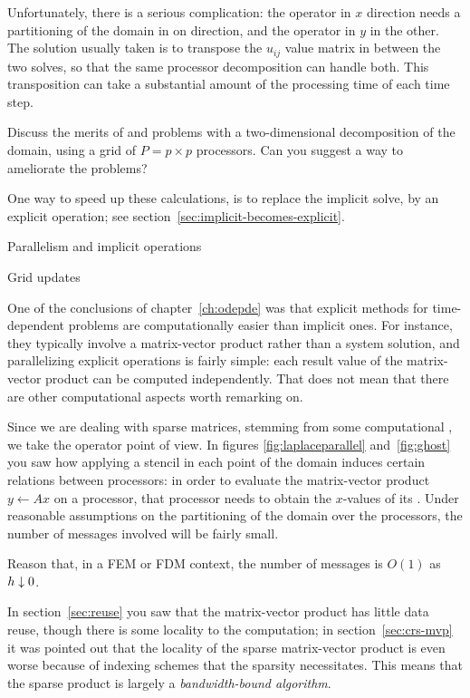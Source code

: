 Unfortunately, there is a serious complication: the operator in $x$
direction needs a partitioning of the domain in on direction, and the
operator in $y$ in the other. The solution usually taken is to
transpose the $u_{ij}$ value matrix in between the two solves, so that
the same processor decomposition can handle both. This transposition
can take a substantial amount of the processing time of each time step.

\begin{exercise}
  Discuss the merits of and problems with a two-dimensional
  decomposition of the domain, using a grid of $P=p\times p$
  processors. Can you suggest a way to ameliorate the problems?
\end{exercise}

One way to speed up these calculations, is to replace the implicit
solve, by an explicit operation; see
section~\ref{sec:implicit-becomes-explicit}.

 {Parallelism and implicit operations}
\label{sec:parallel-implicit}


 {Grid updates}

One of the conclusions of chapter~\ref{ch:odepde} was that explicit
methods for time-dependent problems are computationally easier than
implicit ones.  For instance, they typically involve a matrix-vector
product rather than a system solution, and parallelizing explicit
operations is fairly simple: each result value of the matrix-vector
product can be computed independently. That does not mean that there
are other computational aspects worth remarking on.

Since we are dealing with sparse matrices, stemming from some
computational
,
we take the operator point of view. In figures \ref{fig:laplaceparallel} 
and~\ref{fig:ghost} you saw how applying a stencil in each point of the domain 
induces certain relations between processors: in order to evaluate the matrix-vector
product $y\leftarrow Ax$ on a processor, that processor needs to obtain the $x$-values
of its . Under reasonable assumptions on the partitioning
of the domain over the processors, the number of messages involved will be fairly
small.

\begin{exercise}
Reason that, in a \ac{FEM} or \ac{FDM} context,
the number of messages is $O(1)$ as~$h\downarrow\nobreak 0$.
\end{exercise}

In section~\ref{sec:reuse} you saw that the matrix-vector product has
little data reuse, though there is some locality to the computation;
in section~\ref{sec:crs-mvp} it was pointed out that the locality of the 
sparse matrix-vector product is even worse because of
indexing schemes that the sparsity necessitates. This means that the sparse
product is largely a \emph{bandwidth-bound algorithm}. 

